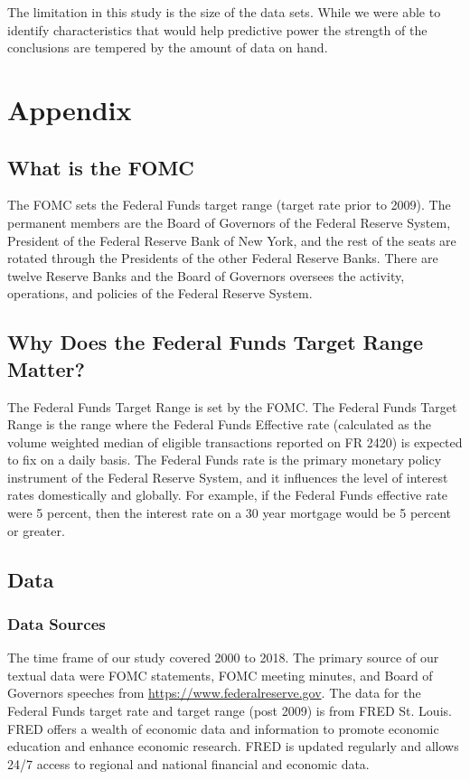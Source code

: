 \documentclass[11pt]{article}
\begin{document}
{The limitation in this study is the size of the data sets. While we were able to identify characteristics that would help predictive power the strength of the conclusions are tempered by the amount of data on hand.


\appendix
\section{Appendix}

\subsection{What is the FOMC}

The FOMC sets the Federal Funds target range (target rate prior to 2009).  The permanent members are the Board of Governors of the Federal Reserve System, President of the Federal Reserve Bank of New York, and the rest of the seats are rotated through the Presidents of the other Federal Reserve Banks.  There are twelve Reserve Banks and the Board of Governors oversees the activity, operations, and policies of the Federal Reserve System.   

\subsection{Why Does the Federal Funds Target Range Matter?}

The Federal Funds Target Range is set by the FOMC.  The Federal Funds Target Range is the range where the Federal Funds Effective rate (calculated as the volume weighted median of eligible transactions reported on FR 2420) is expected to fix on a daily basis.  The Federal Funds rate is the primary monetary policy instrument of the Federal Reserve System, and it influences the level of interest rates domestically and globally.  For example, if the Federal Funds effective rate were 5 percent, then the interest rate on a 30 year mortgage would be 5 percent or greater.  

\subsection{Data}

\subsubsection{Data Sources}
The time frame of our study covered 2000 to 2018.  
The primary source of our textual data were FOMC statements, FOMC meeting minutes, and Board of Governors speeches from \url{https://www.federalreserve.gov}.  
The data for the Federal Funds target rate and target range (post 2009) is from FRED St. Louis.  
FRED offers a wealth of economic data and information to promote economic education and enhance economic research. 
FRED is updated regularly and allows 24/7 access to regional and national financial and economic data.


}
\end{document}
